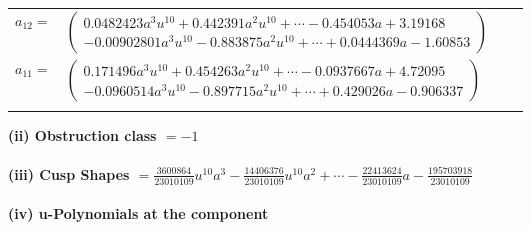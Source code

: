 \documentclass[1p]{elsarticle_modified}
\theoremstyle{definition}
\begin{document}
\begin{tabular}{m{7pt} m{180pt} m{7pt} m{180pt} }
\flushright $a_{12}=$&$\begin{pmatrix}0.0482423 a^{3} u^{10}+0.442391 a^{2} u^{10}+\cdots-0.454053 a+3.19168\\-0.00902801 a^{3} u^{10}-0.883875 a^{2} u^{10}+\cdots+0.0444369 a-1.60853\end{pmatrix}$ \\
\flushright $a_{11}=$&$\begin{pmatrix}0.171496 a^{3} u^{10}+0.454263 a^{2} u^{10}+\cdots-0.0937667 a+4.72095\\-0.0960514 a^{3} u^{10}-0.897715 a^{2} u^{10}+\cdots+0.429026 a-0.906337\end{pmatrix}$\\&\end{tabular}
\flushleft \textbf{(ii) Obstruction class $= -1$}\\~\\
\flushleft \textbf{(iii) Cusp Shapes $= \frac{3600864}{23010109} u^{10} a^3-\frac{14406376}{23010109} u^{10} a^2+\cdots-\frac{22413624}{23010109} a-\frac{195703918}{23010109}$}\\~\\
\newpage\renewcommand{\arraystretch}{1}
\flushleft \textbf{(iv) u-Polynomials at the component}\newline \\
\end{document}
